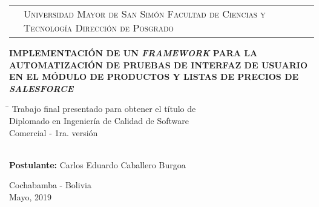 \newcommand{\umsslogo}{
\adjustbox{valign=t}{}
}
\newcommand{\fcytlogo}{
\adjustbox{valign=t}{}
}

\begin{titlepage}

\begin{tabular}[t]{c p{8.6cm} c}
\umsslogo &
\vfill
\large{\textsc{Universidad Mayor de San Simón}} \newline
\large{\textsc{Facultad de Ciencias y Tecnología}} \newline
\large{\textsc{Dirección de Posgrado}} &
\fcytlogo \\
\end{tabular}
\vspace{3.5cm}
\begin{center}
\LARGE{\bf{IMPLEMENTACIÓN DE UN \emph{FRAMEWORK} PARA LA AUTOMATIZACIÓN DE
PRUEBAS DE INTERFAZ DE USUARIO EN EL MÓDULO DE PRODUCTOS Y LISTAS DE PRECIOS
DE \emph{SALESFORCE}}}
\end{center}
\vfill
\begin{tabbing}
\hspace{6cm}\=\+
Trabajo final presentado para obtener el título de \\
Diplomado en Ingeniería de Calidad de Software \\
Comercial - 1ra. versión\\
\\
\end{tabbing}
\vspace{2.5cm}
\textbf{Postulante:} Carlos Eduardo Caballero Burgoa\\
\begin{center}
Cochabamba - Bolivia\\
Mayo, 2019
\end{center}
\end{titlepage}

